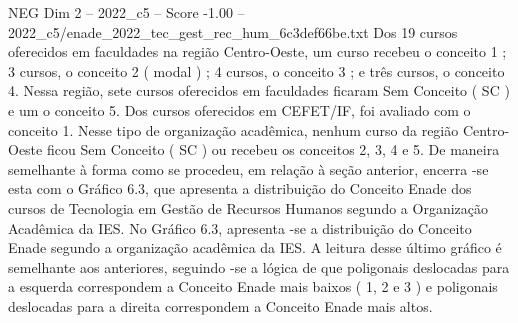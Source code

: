 \begin{textsample}{NEG Dim 2 – 2022\_c5 – Score -1.00 – 2022\_c5/enade\_2022\_tec\_gest\_rec\_hum\_6c3def66be.txt}
Dos 19 cursos oferecidos em faculdades na região Centro-Oeste, um curso recebeu o conceito 1 ; 3 cursos, o conceito 2 ( modal ) ; 4 cursos, o conceito 3 ; e três cursos, o conceito 4.
Nessa região, sete cursos oferecidos em faculdades ficaram Sem Conceito ( SC ) e um o conceito 5.
Dos cursos oferecidos em CEFET/IF, foi avaliado com o conceito 1.
Nesse tipo de organização acadêmica, nenhum curso da região Centro-Oeste ficou Sem Conceito ( SC ) ou recebeu os conceitos 2, 3, 4 e 5.
De maneira semelhante à forma como se procedeu, em relação à seção anterior, encerra -se esta com o Gráfico 6.3, que apresenta a distribuição do Conceito Enade dos cursos de Tecnologia em Gestão de Recursos Humanos segundo a Organização Acadêmica da IES.
No Gráfico 6.3, apresenta -se a distribuição do Conceito Enade segundo a organização acadêmica da IES.
A leitura desse último gráfico é semelhante aos anteriores, seguindo -se a lógica de que poligonais deslocadas para a esquerda correspondem a Conceito Enade mais baixos ( 1, 2 e 3 ) e poligonais deslocadas para a direita correspondem a Conceito Enade mais altos.

\end{textsample}
